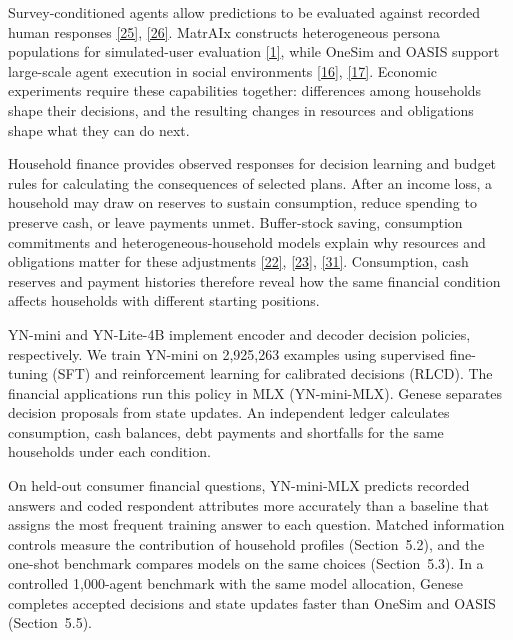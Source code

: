 \documentclass[10pt]{article}
\begin{document}
Survey-conditioned agents allow predictions to be evaluated against recorded human responses \href{https://www.cambridge.org/core/journals/political-analysis/article/abs/out-of-one-many-using-language-models-to-simulate-human-samples/035D7C8A55B237942FB6DBAD7CAA4E49}{[25]}, \href{https://arxiv.org/abs/2411.10109v3}{[26]}. MatrAIx constructs heterogeneous persona populations for simulated-user evaluation \href{https://arxiv.org/abs/2608.04205}{[1]}, while OneSim and OASIS support large-scale agent execution in social environments \href{https://arxiv.org/abs/2505.07581}{[16]}, \href{https://arxiv.org/abs/2411.11581}{[17]}. Economic experiments require these capabilities together: differences among households shape their decisions, and the resulting changes in resources and obligations shape what they can do next.

Household finance provides observed responses for decision learning and budget rules for calculating the consequences of selected plans. After an income loss, a household may draw on reserves to sustain consumption, reduce spending to preserve cash, or leave payments unmet. Buffer-stock saving, consumption commitments and heterogeneous-household models explain why resources and obligations matter for these adjustments \href{https://academic.oup.com/qje/article-abstract/112/1/1/1870884}{[22]}, \href{https://academic.oup.com/qje/article-abstract/122/2/831/1942152}{[23]}, \href{https://www.aeaweb.org/articles?id=10.1257/aer.20160042}{[31]}. Consumption, cash reserves and payment histories therefore reveal how the same financial condition affects households with different starting positions.

YN-mini and YN-Lite-4B implement encoder and decoder decision policies, respectively. We train YN-mini on 2,925,263 examples using supervised fine-tuning (SFT) and reinforcement learning for calibrated decisions (RLCD). The financial applications run this policy in MLX (YN-mini-MLX). Genese separates decision proposals from state updates. An independent ledger calculates consumption, cash balances, debt payments and shortfalls for the same households under each condition.

On held-out consumer financial questions, YN-mini-MLX predicts recorded answers and coded respondent attributes more accurately than a baseline that assigns the most frequent training answer to each question. Matched information controls measure the contribution of household profiles (Section~5.2), and the one-shot benchmark compares models on the same choices (Section~5.3). In a controlled 1,000-agent benchmark with the same model allocation, Genese completes accepted decisions and state updates faster than OneSim and OASIS (Section~5.5).
\end{document}
